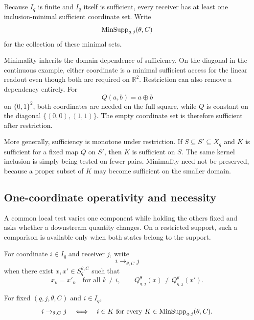 Because $I_q$ is finite and $I_q$ itself is sufficient, every receiver has at least one inclusion-minimal sufficient coordinate set. Write
\[
\operatorname{MinSupp}_{q,j}(\theta,C)
\]
for the collection of these minimal sets.

Minimality inherits the domain dependence of sufficiency. On the diagonal in the continuous example, either coordinate is a minimal sufficient access for the linear readout even though both are required on $\mathbb R^2$. Restriction can also remove a dependency entirely. For
\[
Q(a,b)=a\oplus b
\]
on $\{0,1\}^2$, both coordinates are needed on the full square, while $Q$ is constant on the diagonal $\{(0,0),(1,1)\}$. The empty coordinate set is therefore sufficient after restriction.

More generally, sufficiency is monotone under restriction. If $S\subseteq S'\subseteq X_q$ and $K$ is sufficient for a fixed map $Q$ on $S'$, then $K$ is sufficient on $S$. The same kernel inclusion is simply being tested on fewer pairs. Minimality need not be preserved, because a proper subset of $K$ may become sufficient on the smaller domain.

\subsection{One-coordinate operativity and necessity}

A common local test varies one component while holding the others fixed and asks whether a downstream quantity changes. On a restricted support, such a comparison is available only when both states belong to the support.

\begin{definition}
For coordinate $i\in I_q$ and receiver $j$, write
\[
i\to_{\theta,C}j
\]
when there exist $x,x'\in S_q^{\theta,C}$ such that
\[
x_k=x'_k\quad\text{for all }k\neq i,
\qquad
Q_{q,j}^\theta(x)\neq Q_{q,j}^\theta(x').
\]
\end{definition}

\begin{proposition}
\label{prop:direct-necessity}
For fixed $(q,j,\theta,C)$ and $i\in I_q$,
\begin{equation}
i\to_{\theta,C}j
\quad\Longleftrightarrow\quad
i\in K
\text{ for every }
K\in\operatorname{MinSupp}_{q,j}(\theta,C).
\label{eq:direct-necessity}
\end{equation}
\end{proposition}

